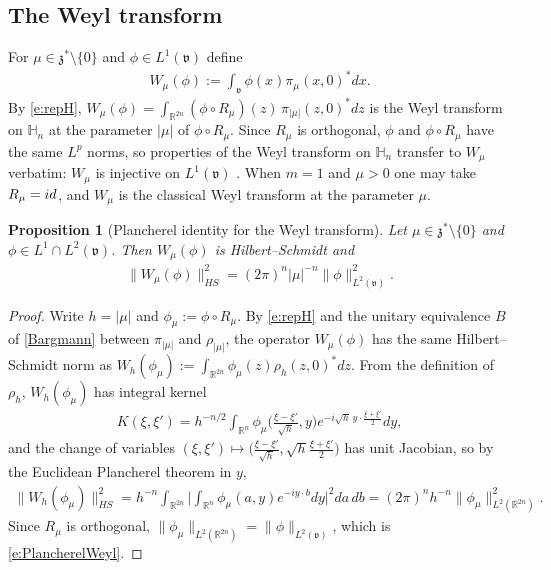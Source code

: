 \documentclass[11pt]{amsart}
\theoremstyle{plain}
\newtheorem{proposition}[theorem]{Proposition}
\theoremstyle{definition}
\theoremstyle{remark}
\numberwithin{equation}{section}
\def\fz{\mathfrak{z}}
\def\fv{\mathfrak{v}}
\def\mz{\setminus\{0\}}
\def\R{{\mathbb R}}%
\def \heis {\mathbb{H}}
\numberwithin{equation}{section}
\begin{document}
\subsection{The Weyl transform}\label{s:Weyl}
For $\mu\in \fz^*\mz$ and $\phi\in L^1(\fv)$ define
\begin{align}\label{e:WeylDef}
	W_\mu(\phi):=\int_\fv\phi(x)\pi_\mu(x, 0)^*dx.
\end{align}
By \eqref{e:repH}, $W_\mu(\phi)=\int_{\R^{2n}}(\phi\circ R_\mu)(z)\,\pi_{|\mu|}(z, 0)^*dz$ is the Weyl transform on $\heis_n$ at the parameter $|\mu|$ \cite{thangaveluHarmonicAnalysisHeisenberg1998, follandHarmonicAnalysisPhase1989} of $\phi\circ R_\mu$. Since $R_\mu$ is orthogonal, $\phi$ and $\phi\circ R_\mu$ have the same $L^p$ norms, so properties of the Weyl transform on $\heis_n$ transfer to $W_\mu$ verbatim: $W_\mu$ is injective on $L^1(\fv)$ \cite{thangaveluHarmonicAnalysisHeisenberg1998}. When $m=1$ and $\mu>0$ one may take $R_\mu={\rm id}$, and $W_\mu$ is the classical Weyl transform at the parameter $\mu$.

\begin{proposition}[Plancherel identity for the Weyl transform]\label{p:PlancherelWeyl}
	Let $\mu\in \fz^*\mz$ and $\phi\in L^1\cap L^2(\fv)$. Then $W_\mu(\phi)$ is Hilbert--Schmidt and
	\begin{align}\label{e:PlancherelWeyl}
		\|W_\mu(\phi)\|^2_{HS}=(2\pi)^n|\mu|^{-n}\|\phi\|^2_{L^2(\fv)}.
	\end{align}
\end{proposition}
\begin{proof}
	Write $h=|\mu|$ and $\phi_\mu:=\phi\circ R_\mu$. By \eqref{e:repH} and the unitary equivalence $B$ of \eqref{Bargmann} between $\pi_{|\mu|}$ and $\rho_{|\mu|}$, the operator $W_\mu(\phi)$ has the same Hilbert--Schmidt norm as $W_h(\phi_\mu):=\int_{\R^{2n}}\phi_\mu(z)\rho_h(z, 0)^*dz$. From the definition of $\rho_h$, $W_h(\phi_\mu)$ has integral kernel
	\begin{align*}
		K(\xi, \xi')=h^{-n/2}\int_{\R^n}\phi_\mu\Big(\frac{\xi-\xi'}{\sqrt h}, y\Big)e^{-i\sqrt h\, y\cdot\frac{\xi+\xi'}{2}}dy,
	\end{align*}
	and the change of variables $(\xi, \xi')\mapsto\big(\frac{\xi-\xi'}{\sqrt h}, \sqrt h\frac{\xi+\xi'}{2}\big)$ has unit Jacobian, so by the Euclidean Plancherel theorem in $y$,
	\begin{align*}
		\|W_h(\phi_\mu)\|_{HS}^2=h^{-n}\int_{\R^{2n}}\Big|\int_{\R^n}\phi_\mu(a, y)e^{-iy\cdot b}dy\Big|^2da\, db=(2\pi)^nh^{-n}\|\phi_\mu\|^2_{L^2(\R^{2n})}.
	\end{align*}
	Since $R_\mu$ is orthogonal, $\|\phi_\mu\|_{L^2(\R^{2n})}=\|\phi\|_{L^2(\fv)}$, which is \eqref{e:PlancherelWeyl}.
\end{proof}
\end{document}
